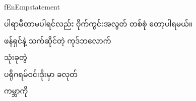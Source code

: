 \noindent {}\\
\qquad {}\fEn{,} \fEn{,} \fEn{,} 
\\
\noindent {}\\
\qquad \\fEnEmp{statement}


ပါရာမီတာမပါရင်လည်း ဝိုက်ကွင်းအလွတ် တစ်စုံ  တော့ပါရမယ်။

 

ဖန်ရှင်နဲ့ သက်ဆိုင်တဲ့ ကုဒ်ဘလောက် 

 သုံးခုတွဲ 

ပရိုဂရမ်ဝင်းဒိုးမှာ   ခလုတ်

 ကမ္ဘာကို
